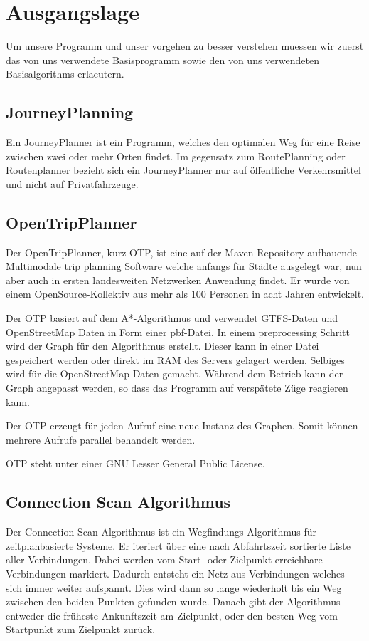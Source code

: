 \section{Ausgangslage}
Um unsere Programm und unser vorgehen zu besser verstehen muessen wir zuerst das von uns verwendete Basisprogramm sowie den von uns verwendeten Basisalgorithms erlaeutern.

\subsection{JourneyPlanning}
Ein JourneyPlanner ist ein Programm, welches den optimalen Weg für eine Reise zwischen zwei oder mehr Orten findet. Im gegensatz zum RoutePlanning oder Routenplanner bezieht sich ein JourneyPlanner nur auf öffentliche Verkehrsmittel und nicht auf Privatfahrzeuge.

\subsection{OpenTripPlanner}

Der OpenTripPlanner, kurz OTP, ist eine auf der Maven-Repository %
aufbauende Multimodale trip planning Software welche anfangs für Städte ausgelegt war, nun aber auch in ersten landesweiten Netzwerken Anwendung findet. Er wurde von einem OpenSource-Kollektiv aus mehr als 100 Personen in acht Jahren entwickelt. %

Der OTP basiert auf dem A*-Algorithmus und verwendet GTFS-Daten und OpenStreetMap Daten in Form einer pbf-Datei. In einem preprocessing Schritt wird der Graph für den Algorithmus erstellt. Dieser kann in einer Datei gespeichert werden oder direkt im RAM des Servers gelagert werden. Selbiges wird für die OpenStreetMap-Daten gemacht. Während dem Betrieb kann der Graph angepasst werden, so dass das Programm auf verspätete Züge reagieren kann. %

Der OTP erzeugt für jeden Aufruf eine neue Instanz des Graphen. Somit können mehrere Aufrufe parallel behandelt werden.

OTP steht unter einer GNU Lesser General Public License. 





\subsection{Connection Scan Algorithmus}
Der Connection Scan Algorithmus ist ein Wegfindungs-Algorithmus für zeitplanbasierte Systeme. Er iteriert über eine nach Abfahrtszeit sortierte Liste aller Verbindungen. Dabei werden vom Start- oder Zielpunkt erreichbare Verbindungen markiert. Dadurch entsteht ein Netz aus Verbindungen welches sich immer weiter aufspannt. Dies wird dann so lange wiederholt bis ein Weg zwischen den beiden Punkten gefunden wurde. Danach gibt der Algorithmus entweder die früheste Ankunftszeit am Zielpunkt, oder den besten Weg vom Startpunkt zum Zielpunkt zurück.

